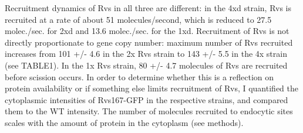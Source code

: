 	\vspace{5mm}
Recruitment dynamics of Rvs in all three are different: in the 4xd strain, Rvs is recruited at a rate of about 51 molecules/second, which is reduced to 27.5 molec./sec. for 2xd and 13.6 molec./sec. for the 1xd. Recruitment of Rvs is not directly proportionate to gene copy number: maximum number of Rvs recruited increases from 101 +/- 4.6 in the 2x Rvs strain to 143 +/- 5.5 in the 4x strain (see TABLE1). In the 1x Rvs strain, 80 +/- 4.7 molecules of Rvs are recruited before scission occurs. In order to determine whether this is a reflection on protein availability or if something else limits recruitment of Rvs, I quantified the cytoplasmic intensities of Rvs167-GFP in the respective strains, and compared them to the WT intensity. The number of molecules recruited to endocytic sites scales with the amount of protein in the cytoplasm (see methods).  



